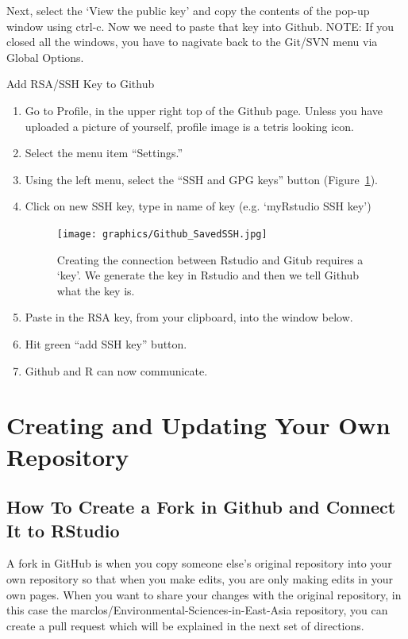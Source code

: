 \documentclass[12pt]{../SOP4_alpha}\usepackage[]{graphicx}\usepackage[]{color}
\begin{document}
\NP Next, select the `View the public key' and copy the contents of the pop-up window using ctrl-c. Now we need to paste that key into Github. NOTE: If you closed all the windows, you have to nagivate back to the Git/SVN menu via Global Options. 

\NP Add RSA/SSH Key to Github
  \begin{enumerate}
  \item Go to Profile, in the upper right top of the Github page. Unless you have uploaded a picture of yourself, profile image is a tetris looking icon.
  \item Select the menu item ``Settings.''
  \item Using the left menu, select the ``SSH and GPG keys'' button (Figure~\ref{fig:githubkey}).
  \item Click on new SSH key, type in name of key (e.g. `myRstudio SSH key')
  
\begin{figure}
\centering
\texttt{[image: graphics/Github\_SavedSSH.jpg]}
\caption{Creating the connection between Rstudio and Gitub requires a `key'. We generate the key in Rstudio and then we tell Github what the key is.}
\label{fig:githubkey}
\end{figure}

  \item Paste in the RSA key, from your clipboard, into the window below.
  \item Hit green ``add SSH key'' button.
  \item Github and R can now communicate.
  \end{enumerate}

\section{Creating and Updating Your Own Repository}

\subsection {How To Create a Fork in Github and Connect It to RStudio}
A fork in GitHub is when you copy someone else's original repository into your own repository so that when you make edits, you are only making edits in your own pages. When you want to share your changes with the original repository, in this case the marclos/Environmental-Sciences-in-East-Asia repository, you can create a pull request which will be explained in the next set of directions. 
\end{document}
